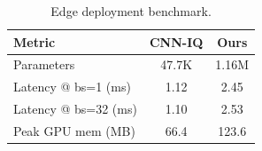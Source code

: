 \begin{table}[!t]
\centering
\caption{Edge deployment benchmark.}
\label{tab:edge_deployment}
\footnotesize
\setlength{\tabcolsep}{4pt}
\renewcommand{\arraystretch}{1.05}
\begin{tabular}{@{}lcc@{}}
\toprule
Metric & CNN-IQ & Ours \\
\midrule
Parameters & 47.7K & 1.16M \\
Latency @ bs=1 (ms) & 1.12 & 2.45 \\
Latency @ bs=32 (ms) & 1.10 & 2.53 \\
Peak GPU mem (MB) & 66.4 & 123.6 \\
\bottomrule
\end{tabular}
\end{table}
